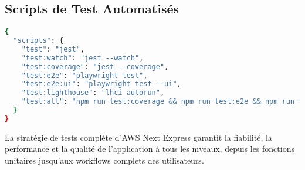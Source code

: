\subsection{Scripts de Test Automatisés}

\begin{lstlisting}[language=bash, caption=Scripts de test dans package.json]
{
  "scripts": {
    "test": "jest",
    "test:watch": "jest --watch",
    "test:coverage": "jest --coverage",
    "test:e2e": "playwright test",
    "test:e2e:ui": "playwright test --ui",
    "test:lighthouse": "lhci autorun",
    "test:all": "npm run test:coverage && npm run test:e2e && npm run test:lighthouse"
  }
}
\end{lstlisting}

La stratégie de tests complète d'AWS Next Express garantit la fiabilité, la performance et la qualité de l'application à tous les niveaux, depuis les fonctions unitaires jusqu'aux workflows complets des utilisateurs. 
